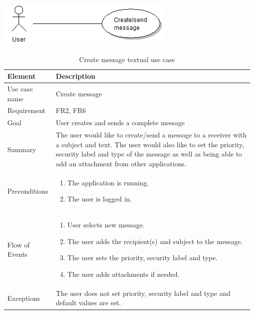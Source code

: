 \begin{table}
\begin{center}
\begin{center}
\includegraphics[width=\textwidth]{create_message}
\end{center}
\begin{tabular}{p{3cm}|p{12cm}} \hline
\textbf{Element} & \textbf{Description} \\ \hline \hline
Use case name & Create message \\
Requirement & FR2, FR6 \\
Goal & User creates and sends a complete message \\
Summary &The user would like to create/send a message to a receiver with a subject and text. The user would also like to set the priority, security label and type of the message as well as being able to add an attachment from other applications. \\
Preconditions &
\begin{enumerate}
\item{}The application is running.
\item{}The user is logged in.
\end{enumerate} \\ \hline
Flow of Events &
\begin{enumerate}
\item{}User selects new message.
\item{}The user adds the recipient(s) and subject to the message.
\item{}The user sets the priority, security label and type.
\item{}The user adds attachments if needed.
\end{enumerate} \\ \hline
Exceptions & The user does not set priority, security label and type and default values are set.\\ \hline
\end{tabular}
\end{center}
\caption{Create message textual use case} \label{tab:createmessage}
\end{table}

